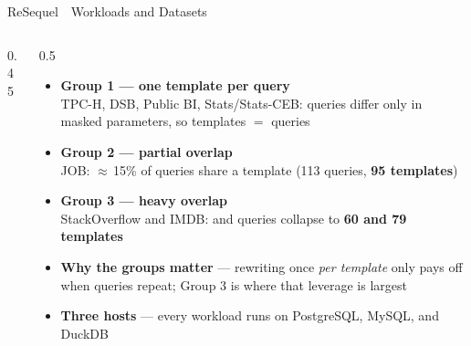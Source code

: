 \documentclass[aspectratio=169]{beamer}
\newcommand{\hred}[1]{\textcolor{tug}{\textbf{#1}}}
\newcommand{\apptitle}[3]{%
  \textcolor{#1}{#2}~\textcolor{black!30}{\textbar}~#3}
\begin{document}
{\begin{frame}{\apptitle{tug}{ReSequel}{Workloads and Datasets}}
\begin{columns}[T]
\begin{column}{0.45\textwidth}
  \centering
  \\[1.6mm]
\end{column}
\hfill
\begin{column}{0.5\textwidth}
  \raggedright
  {\scriptsize
  \begin{itemize}\setlength{\itemsep}{1.6mm}
    \item \textbf{Group 1 --- one template per query}\\
          TPC-H, DSB, Public BI, Stats/Stats-CEB: queries differ only in masked
          parameters, so templates $=$ queries
    \item \textbf{Group 2 --- partial overlap}\\
          JOB: $\approx$\,15\% of queries share a template (113 queries, \hred{95 templates})
    \item \textbf{Group 3 --- heavy overlap}\\
          StackOverflow and IMDB:  and  queries collapse to
          \hred{60 and 79 templates}
    \item \textbf{Why the groups matter} --- rewriting once \emph{per template} only pays
          off when queries repeat; Group 3 is where that leverage is largest
    \item \textbf{Three hosts} --- every workload runs on PostgreSQL, MySQL, and DuckDB
  \end{itemize}}
\end{column}


\end{columns}
\end{frame}}
\end{document}

